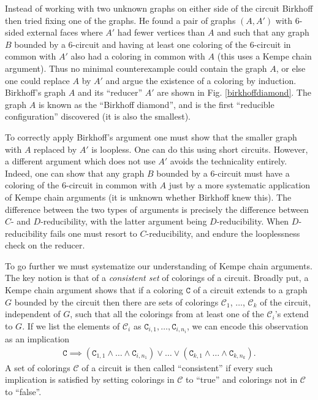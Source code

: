 \documentclass[11pt]{article}
\newcommand{\eqn}{\begin{eqnarray}}
\newcommand{\uneq}{\end{eqnarray}}
\newcommand{\mcal}{\mathcal}
\newcommand{\rC}{\texttt{C}}
\newcommand{\gA}{A}
\newcommand{\gB}{B}
\begin{document}
\birkhoffdiamondfig

Instead of working with two unknown graphs on either side of the circuit Birkhoff then tried fixing one of the graphs. He found a pair of graphs $(\gA, \gA')$ with 6-sided external faces where $\gA'$ had fewer vertices than $\gA$ and such that any graph $\gB$ bounded by a 6-circuit and having at least one coloring of the 6-circuit in common with $\gA'$ 
also had a coloring in common with $\gA$ (this uses a Kempe chain argument). Thus no minimal counterexample could contain the graph $\gA$, or else one could replace $\gA$ by $\gA'$ and argue the existence of a coloring by induction. 
Birkhoff's graph $\gA$ and its ``reducer'' $\gA'$ are shown in Fig$.$ \ref{birkhoffdiamond}. The graph $\gA$ is known as the ``Birkhoff diamond'', and is the first ``reducible configuration'' discovered (it is also the smallest).

To correctly apply Birkhoff's argument one must show 
that the smaller graph with $\gA$ replaced by $\gA'$ is loopless. One can do this using short circuits. However, a different argument which does not use $\gA'$ avoids the technicality entirely. Indeed, one can show that any graph $\gB$ bounded by a 6-circuit must have a coloring of the 6-circuit in common with $\gA$ just by a more systematic application of Kempe chain arguments (it is unknown whether Birkhoff knew this). 
The difference between the two types of arguments is precisely the difference between $C$- and $D$-reducibility, with the latter argument being $D$-reducibility. When $D$-reducibility fails one must resort to $C$-reducibility, and endure the looplessness check on the reducer.

To go further we must systematize our understanding of Kempe chain arguments. The key notion is that of a \emph{consistent set} of colorings of a circuit. Broadly put, a Kempe chain argument shows that if a coloring $\rC$ of a circuit extends to a graph $G$ bounded by the circuit then there are sets of colorings 
$\mcal{C}_1$, $\ldots$, $\mcal{C}_k$ 
of the circuit, independent of $G$, such that all the colorings from at least one of the $\mcal{C}_i$'s extend to $G$. If we list the elements of $\mcal{C}_i$ as $\rC_{i,1}, \ldots, \rC_{i,n_i}$, we can encode this observation as an implication
\eqn\label{implic}
\rC \implies (\rC_{1,1} \wedge \dots \wedge \rC_{i,n_1}) \vee \dots \vee (\rC_{k,1} \wedge \dots \wedge \rC_{k,n_k}).
\uneq
A set of colorings $\mcal{C}$ of a circuit is then called ``consistent'' if every such implication is satisfied by setting colorings in $\mcal{C}$ to ``true'' and colorings not in $\mcal{C}$ to ``false''. 
\end{document}

